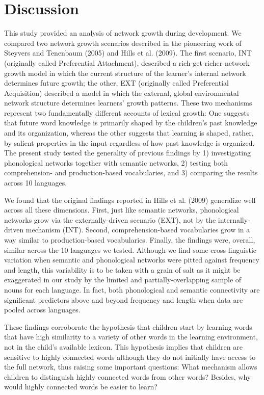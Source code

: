 \documentclass[english,floatsintext,man]{apa6}
\theoremstyle{definition}
\theoremstyle{definition}
\theoremstyle{definition}
\theoremstyle{remark}
\begin{document}
\section{Discussion}\label{discussion}

This study provided an analysis of network growth during development. We
compared two network growth scenarios described in the pioneering work
of Steyvers and Tenenbaum (2005) and Hills et al. (2009). The first
scenario, INT (originally called Preferential Attachment), described a
rich-get-richer network growth model in which the current structure of
the learner's internal network determines future growth; the other, EXT
(originally called Preferential Acquisition) described a model in which
the external, global environmental network structure determines
learners' growth patterns. These two mechanisms represent two
fundamentally different accounts of lexical growth: One suggests that
future word knowledge is primarily shaped by the children's past
knowledge and its organization, whereas the other suggests that learning
is shaped, rather, by salient properties in the input regardless of how
past knowledge is organized. The present study tested the generality of
previous findings by 1) investigating phonological networks together
with semantic networks, 2) testing both comprehension- and
production-based vocabularies, and 3) comparing the results across 10
languages.

We found that the original findings reported in Hills et al. (2009)
generalize well across all these dimensions. First, just like semantic
networks, phonological networks grow via the externally-driven scenario
(EXT), not by the internally-driven mechanism (INT). Second,
comprehension-based vocabularies grow in a way similar to
production-based vocabularies. Finally, the findings were, overall,
similar across the 10 languages we tested. Although we find some
cross-linguistic variation when semantic and phonological networks were
pitted against frequency and length, this variability is to be taken
with a grain of salt as it might be exaggerated in our study by the
limited and partially-overlapping sample of nouns for each language. In
fact, both phonological and semantic connectivity are significant
predictors above and beyond frequency and length when data are pooled
across languages.

These findings corroborate the hypothesis that children start by
learning words that have high similarity to a variety of other words in
the learning environment, not in the child's available lexicon. This
hypothesis implies that children are sensitive to highly connected words
although they do not initially have access to the full network, thus
raising some important questions: What mechanism allows children to
distinguish highly connected words from other words? Besides, why would
highly connected words be easier to learn?
\end{document}
